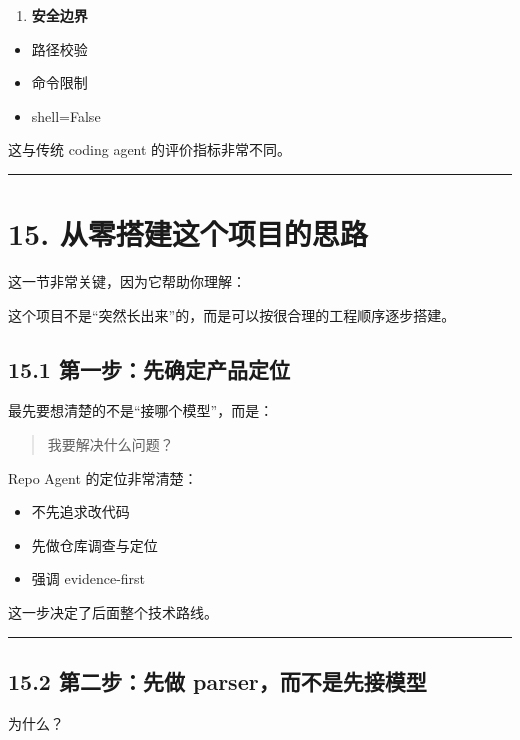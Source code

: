 \documentclass[UTF8,12pt,openany]{ctexbook}
\begin{document}
\begin{enumerate}
\item \textbf{安全边界}
\end{enumerate}
\begin{itemize}
\item 路径校验
\item 命令限制
\item shell=False
\end{itemize}

这与传统 coding agent 的评价指标非常不同。\par

\hrule

\section{15. 从零搭建这个项目的思路}

这一节非常关键，因为它帮助你理解：  \par
这个项目不是“突然长出来”的，而是可以按很合理的工程顺序逐步搭建。\par

\subsection{15.1 第一步：先确定产品定位}

最先要想清楚的不是“接哪个模型”，而是：\par

\begin{quote}
我要解决什么问题？
\end{quote}

Repo Agent 的定位非常清楚：\par

\begin{itemize}
\item 不先追求改代码
\item 先做仓库调查与定位
\item 强调 evidence-first
\end{itemize}

这一步决定了后面整个技术路线。\par

\hrule

\subsection{15.2 第二步：先做 parser，而不是先接模型}

为什么？\par
\end{document}
